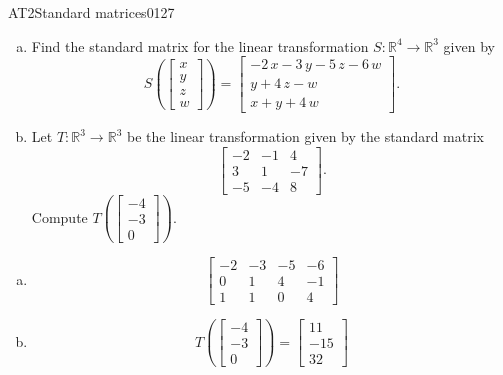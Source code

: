\begin{exercise}{AT2}{Standard matrices}{0127} 
\begin{exerciseStatement} 

\begin{enumerate}[(a)]
\item Find the standard matrix for the linear transformation \(S:\mathbb{R}^4 \to \mathbb{R}^3\) given by \[S\left( \left[\begin{array}{c}
x \\
y \\
z \\
{w}
\end{array}\right] \right) = \left[\begin{array}{c}
-2 \, x - 3 \, y - 5 \, z - 6 \, {w} \\
y + 4 \, z - {w} \\
x + y + 4 \, {w}
\end{array}\right].\] 
\item Let \(T:\mathbb{R}^3 \to \mathbb{R}^3\) be the linear transformation given by the standard matrix \[\left[\begin{array}{ccc}
-2 & -1 & 4 \\
3 & 1 & -7 \\
-5 & -4 & 8
\end{array}\right].\] Compute \(T\left(\left[\begin{array}{c}
-4 \\
-3 \\
0
\end{array}\right]\right)\). 
\end{enumerate}

     \end{exerciseStatement}
 \begin{exerciseAnswer} 

\begin{enumerate}[(a)]
\item  \[\left[\begin{array}{cccc}
-2 & -3 & -5 & -6 \\
0 & 1 & 4 & -1 \\
1 & 1 & 0 & 4
\end{array}\right]\] 
\item  \[T\left(\left[\begin{array}{c}
-4 \\
-3 \\
0
\end{array}\right]\right)=\left[\begin{array}{c}
11 \\
-15 \\
32
\end{array}\right]\] 
\end{enumerate}

     \end{exerciseAnswer}
 \end{exercise}



